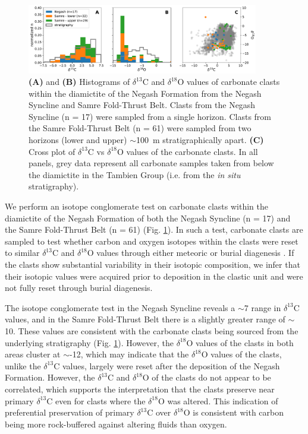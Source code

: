 \documentclass[11pt,letterpaper]{article}
\newcommand{\dC}{$\delta^{13}$C\xspace}
\newcommand{\dO}{$\delta^{18}$O\xspace}
\newcommand{\permil}{\textperthousand\xspace}
\begin{document}
\begin{figure}[h!]
\begin{center}
	\includegraphics[width=0.9\textwidth]{Figures/Clast_Analysis.pdf}
	\caption{\textbf{(A)} and \textbf{(B)} Histograms of \dC and \dO values of carbonate clasts within the diamictite of the Negash Formation from the Negash Syncline and Samre Fold-Thrust Belt. Clasts from the Negash Syncline (n = 17) were sampled from a single horizon. Clasts from the Samre Fold-Thrust Belt (n = 61) were sampled from two horizons (lower and upper) $\sim$100~m stratigraphically apart. \textbf{(C)} Cross plot of \dC vs \dO values of the carbonate clasts. In all panels, grey data represent all carbonate samples taken from below the diamictite in the Tambien Group (i.e. from the \textit{in situ} stratigraphy).}
	\label{fig:Clast_Analysis}
\end{center}
\end{figure}

We perform an isotope conglomerate test on carbonate clasts within the diamictite of the Negash Formation of both the Negash Syncline (n = 17) and the Samre Fold-Thrust Belt (n = 61) (Fig. \ref{fig:Clast_Analysis}). In such a test, carbonate clasts are sampled to test whether carbon and oxygen isotopes within the clasts were reset to similar \dC and \dO values through either meteoric or burial diagenesis \citep{Husson2012a, Husson2015a}. If the clasts show substantial variability in their isotopic composition, we infer that their isotopic values were acquired prior to deposition in the clastic unit and were not fully reset through burial diagenesis.

The isotope conglomerate test in the Negash Syncline reveals a $\sim$7\permil range in \dC values, and in the Samre Fold-Thrust Belt there is a slightly greater range of $\sim$10\permil. These values are consistent with the carbonate clasts being sourced from the underlying stratigraphy (Fig. \ref{fig:Clast_Analysis}). However, the \dO values of the clasts in both areas cluster at $\sim$-12\permil, which may indicate that the \dO values of the clasts, unlike the \dC values, largely were reset after the deposition of the Negash Formation. However, the \dC and \dO of the clasts do not appear to be correlated, which supports the interpretation that the clasts preserve near primary \dC even for clasts where the \dO was altered. This indication of preferential preservation of primary \dC over \dO is consistent with carbon being more rock-buffered against altering fluids than oxygen.
\end{document}
